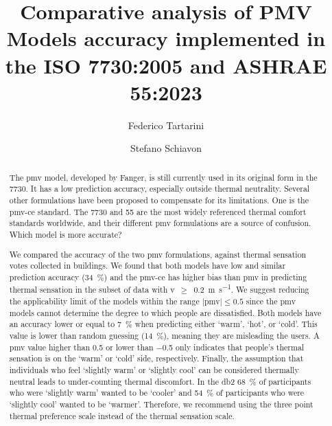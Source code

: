 \begin{frontmatter}

    \title{Comparative analysis of PMV Models accuracy implemented in the ISO 7730:2005 and ASHRAE 55:2023}

    \author[label1]{Federico Tartarini}
    \author[label3]{Stefano Schiavon}

    \address[label1]{School of Architecture, Design, and Planning, The University of Sydney, Sydney, AU}
    \address[label3]{Center for the Built Environment, Department of Architecture, Department of Civil and Environmental Engineering, University of California, Berkeley, CA, USA}


    \begin{abstract}
        The \ac{pmv} model, developed by Fanger, is still currently used in its original form in the \gls{7730}.
        It has a low prediction accuracy, especially outside thermal neutrality.
        Several other formulations have been proposed to compensate for its limitations.
        One is the \ac{pmv-ce} standard.
        The \gls{7730} and \gls{55} are the most widely referenced thermal comfort standards worldwide, and their different \ac{pmv} formulations are a source of confusion.
        Which model is more accurate?

        We compared the accuracy of the two \ac{pmv} formulations, against  thermal sensation votes collected in buildings.
        We found that both models have low and similar prediction accuracy (\qty{34}{\percent}) and the \ac{pmv-ce} has higher bias than \ac{pmv} in predicting thermal sensation in the subset of data with \ac{v}~$\geq$~\qty{0.2}{\m\per\s}.
        We suggest reducing the applicability limit of the models within the range $\mid$\ac{pmv}$\mid \leq 0.5$ since the \ac{pmv} models cannot determine the degree to which people are dissatisfied.
        Both models have an accuracy lower or equal to \qty{7}{\percent} when predicting either `warm', `hot', or `cold'.
        This value is lower than random guessing (\qty{14}{\percent}), meaning they are misleading the users.
        A \ac{pmv} value higher than \num{.5} or lower than \num{-.5} only indicates that people's thermal sensation is on the `warm' or `cold' side, respectively.
        Finally, the assumption that individuals who feel `slightly warm' or `slightly cool' can be considered thermally neutral leads to under-counting thermal discomfort.
        In the \ac{db2} \qty{68}{\percent} of participants who were `slightly warm' wanted to be `cooler' and \qty{54}{\percent} of participants who were `slightly cool' wanted to be `warmer'.
        Therefore, we recommend using the three point thermal preference scale instead of the thermal sensation scale.
    \end{abstract}


\end{frontmatter}

